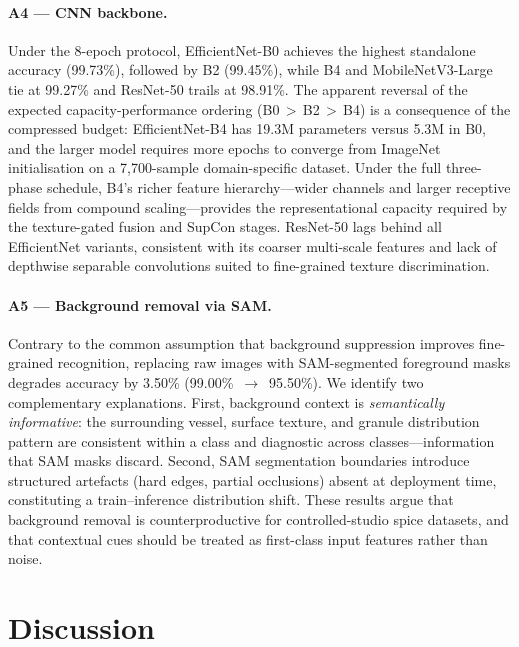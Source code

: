 \documentclass[conference]{IEEEtran}
\begin{document}
\paragraph{A4 — CNN backbone.}
Under the 8-epoch protocol, EfficientNet-B0 achieves the highest standalone
accuracy (99.73\%), followed by B2 (99.45\%), while B4 and MobileNetV3-Large
tie at 99.27\% and ResNet-50 trails at 98.91\%.  The apparent reversal of the
expected capacity-performance ordering (B0\,$>$\,B2\,$>$\,B4) is a
consequence of the compressed budget: EfficientNet-B4 has 19.3M parameters
versus 5.3M in B0, and the larger model requires more epochs to converge
from ImageNet initialisation on a 7{,}700-sample domain-specific dataset.
Under the full three-phase schedule, B4's richer feature hierarchy—wider
channels and larger receptive fields from compound scaling—provides the
representational capacity required by the texture-gated fusion and SupCon
stages.  ResNet-50 lags behind all EfficientNet variants, consistent with
its coarser multi-scale features and lack of depthwise separable
convolutions suited to fine-grained texture discrimination.

\paragraph{A5 — Background removal via SAM.}
Contrary to the common assumption that background suppression improves
fine-grained recognition, replacing raw images with SAM-segmented foreground
masks degrades accuracy by 3.50\% (99.00\%~$\to$~95.50\%).  We identify two
complementary explanations.  First, background context is
\emph{semantically informative}: the surrounding vessel, surface texture, and
granule distribution pattern are consistent within a class and diagnostic
across classes—information that SAM masks discard.  Second, SAM segmentation
boundaries introduce structured artefacts (hard edges, partial occlusions)
absent at deployment time, constituting a train–inference distribution shift.
These results argue that background removal is counterproductive for
controlled-studio spice datasets, and that contextual cues should be treated
as first-class input features rather than noise.


\section{Discussion}
\label{sec:discussion}
\end{document}
